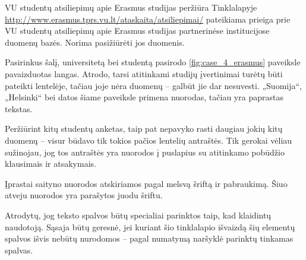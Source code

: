 \begin{xcase}{VU studentų atsiliepimų apie Erasmus studijas peržiūra}
  \xcgoal
  {
    Tinklalapyje \url{http://www.erasmus.tprs.vu.lt/ataskaita/atsiliepimai/}
    pateikiama prieiga prie VU studentų atsiliepimų apie Erasmus studijas
    partnerinėse institucijose duomenų bazės. Norima pasižiūrėti jos duomenis.
  }
  
  \xctools
  {
    Pasirinkus šalį, universitetą bei studentą pasirodo
    \ref{fig:case_4_erasmus} paveiksle pavaizduotas langas. Atrodo, tarsi
    atitinkami studijų įvertinimai turėtų būti pateikti lentelėje, tačiau
    joje nėra duomenų – galbūt jie dar nesuvesti. „Suomija“, „Helsinki“ bei
    datos šiame paveiksle primena nuorodas, tačiau yra paprastas tekstas.

  }
  
  \xcresult
  {
    Peržiūrint kitų studentų anketas, taip pat nepavyko rasti daugiau jokių
    kitų duomenų – visur būdavo tik tokios pačios lentelių antraštės. Tik
    gerokai vėliau sužinojau, jog tos antraštės yra nuorodos į puslapius
    su atitinkamo pobūdžio klausimais ir atsakymais.
  }
  
  \xcprinciples
  {
    {
      Įprastai saityno nuorodos atskiriamos pagal melsvą šriftą ir
      pabraukimą. Šiuo atveju nuorodos yra parašytos juodu šriftu.
    }
  }
  
  \xcthoughts
  {
    Atrodytų, jog teksto spalvos būtų specialiai parinktos taip, kad
    klaidintų naudotoją. Sąsaja būtų geresnė, jei kuriant šio tinklalapio
    išvaizdą šių elementų spalvos išvis nebūtų nurodomos – pagal numatymą
    naršyklė parinktų tinkamas spalvas.
  }
\end{xcase}
